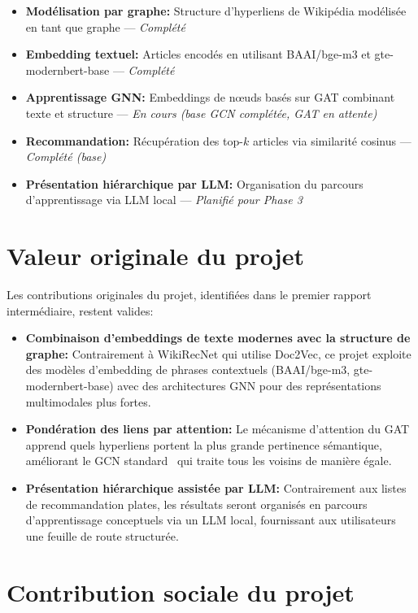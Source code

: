 \begin{itemize}
    \item \textbf{Modélisation par graphe:} Structure d'hyperliens de Wikipédia modélisée en tant que graphe --- \textit{Complété}
    \item \textbf{Embedding textuel:} Articles encodés en utilisant BAAI/bge-m3 et gte-modernbert-base --- \textit{Complété}
    \item \textbf{Apprentissage GNN:} Embeddings de nœuds basés sur GAT combinant texte et structure --- \textit{En cours (base GCN complétée, GAT en attente)}
    \item \textbf{Recommandation:} Récupération des top-$k$ articles via similarité cosinus --- \textit{Complété (base)}
    \item \textbf{Présentation hiérarchique par LLM:} Organisation du parcours d'apprentissage via LLM local --- \textit{Planifié pour Phase 3}
\end{itemize}

\section{Valeur originale du projet}

Les contributions originales du projet, identifiées dans le premier rapport intermédiaire, restent valides:

\begin{itemize}
    \item \textbf{Combinaison d'embeddings de texte modernes avec la structure de graphe:} Contrairement à WikiRecNet \cite{wikirecnet2020} qui utilise Doc2Vec, ce projet exploite des modèles d'embedding de phrases contextuels (BAAI/bge-m3, gte-modernbert-base) avec des architectures GNN pour des représentations multimodales plus fortes.
    \item \textbf{Pondération des liens par attention:} Le mécanisme d'attention du GAT~\cite{velickovic2018graph} apprend quels hyperliens portent la plus grande pertinence sémantique, améliorant le GCN standard~\cite{kipf2017semi} qui traite tous les voisins de manière égale.
    \item \textbf{Présentation hiérarchique assistée par LLM:} Contrairement aux listes de recommandation plates, les résultats seront organisés en parcours d'apprentissage conceptuels via un LLM local, fournissant aux utilisateurs une feuille de route structurée.
\end{itemize}

\section{Contribution sociale du projet}

